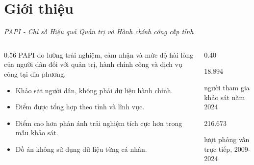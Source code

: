 \section{Giới thiệu}

\begin{frame}[t]{\textsl{PAPI - Chỉ số Hiệu quả Quản trị và Hành chính công cấp tỉnh}}
  \begin{columns}[T,onlytextwidth]
    \begin{column}{0.56\textwidth}
      \small
      PAPI đo lường trải nghiệm, cảm nhận và mức độ hài lòng của người dân đối với quản trị, hành chính công và dịch vụ công tại địa phương.

      \vspace{0.25cm}
      \begin{itemize}
        \setlength{\itemsep}{6pt}
        \item[-] Khảo sát người dân, không phải dữ liệu hành chính.
        \item[-] Điểm được tổng hợp theo tỉnh và lĩnh vực.
        \item[-] Điểm cao hơn phản ánh trải nghiệm tích cực hơn trong mẫu khảo sát.
        \item[-] Đồ án không sử dụng dữ liệu từng cá nhân.
      \end{itemize}
    \end{column}
    \begin{column}{0.40\textwidth}
      \centering

      \vspace{0.32cm}
      {\color{Logo1}\Large 18.894}\par
      {\scriptsize người tham gia khảo sát năm 2024}\par
      \vspace{0.22cm}
      {\color{Logo1}\Large 216.673}\par
      {\scriptsize lượt phỏng vấn trực tiếp, 2009-2024}
    \end{column}
  \end{columns}
\end{frame}

